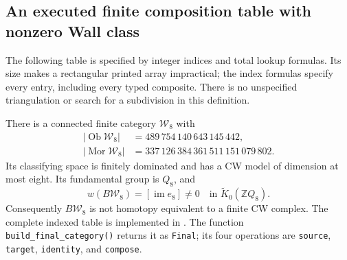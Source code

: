 \subsection{An executed finite composition table with nonzero Wall class}
\label{D:final-table}

The following table is specified by integer indices and total lookup
formulas. Its size makes a rectangular printed array impractical; the
index formulas specify every entry, including every typed composite.
There is no unspecified triangulation or search for a subdivision in
this definition.

\begin{theorem}
\label{D:Q8-final-table}
There is a connected finite category $\mathcal W_8$ with
\[
\begin{split}
 |\operatorname{Ob}\mathcal W_8|
   &=489\,754\,140\,643\,145\,442,\\
 |\operatorname{Mor}\mathcal W_8|
   &=337\,126\,384\,361\,511\,151\,079\,802.
\end{split}
\]
Its classifying space is finitely dominated and has a CW model of
dimension at most eight. Its fundamental group is $Q_8$, and
\[
 w(B\mathcal W_8)=[\operatorname{im}e_8]\ne0
 \quad\text{in }\widetilde K_0(\mathbb ZQ_8).
\]
Consequently $B\mathcal W_8$ is not homotopy equivalent to a finite
CW complex. The complete indexed table is implemented in
.
The function \texttt{build\_final\_category()} returns it as
\texttt{Final}; its four operations are
\texttt{source}, \texttt{target}, \texttt{identity}, and
\texttt{compose}.
\end{theorem}

